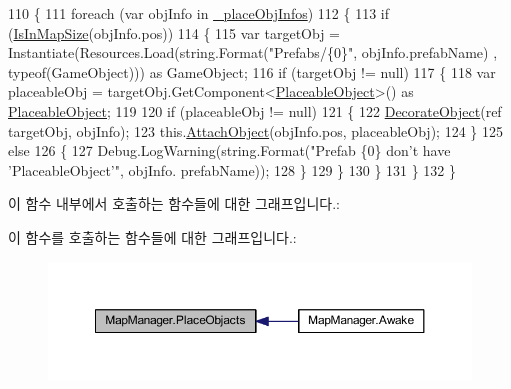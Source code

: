 \begin{DoxyCode}
110     \{
111         \textcolor{keywordflow}{foreach} (var objInfo \textcolor{keywordflow}{in} \hyperlink{class_map_manager_ab581d2c754246f74999a0b744ba2b14f}{\_placeObjInfos})
112         \{
113             \textcolor{keywordflow}{if} (\hyperlink{class_map_manager_a504d7a68ace64557bc3c3254a8b1cddc}{IsInMapSize}(objInfo.pos))
114             \{
115                 var targetObj = Instantiate(Resources.Load(\textcolor{keywordtype}{string}.Format(\textcolor{stringliteral}{"Prefabs/\{0\}"}, objInfo.prefabName)
      , typeof(GameObject))) as GameObject;
116                 if (targetObj != null)
117                 \{
118                     var placeableObj = targetObj.GetComponent<\hyperlink{class_placeable_object}{PlaceableObject}>() as 
      \hyperlink{class_placeable_object}{PlaceableObject};
119 
120                     \textcolor{keywordflow}{if} (placeableObj != null)
121                     \{
122                         \hyperlink{class_map_manager_a31c2b0b9cf8f208a596b65e7f1d88873}{DecorateObject}(ref targetObj, objInfo);
123                         this.\hyperlink{class_map_manager_ab8cbf46e369a9c59ff183a1b6c3b20bb}{AttachObject}(objInfo.pos, placeableObj);
124                     \}
125                     \textcolor{keywordflow}{else}
126                     \{
127                         Debug.LogWarning(\textcolor{keywordtype}{string}.Format(\textcolor{stringliteral}{"Prefab \{0\} don't have 'PlaceableObject'"}, objInfo.
      prefabName));
128                     \}
129                 \}
130             \}
131         \}
132     \}
\end{DoxyCode}


이 함수 내부에서 호출하는 함수들에 대한 그래프입니다.\+:




이 함수를 호출하는 함수들에 대한 그래프입니다.\+:\nopagebreak
\begin{figure}[H]
\begin{center}
\leavevmode
\includegraphics[width=350pt]{class_map_manager_a4213ccbaa1a81d0a47884de50a28de32_icgraph}
\end{center}
\end{figure}


